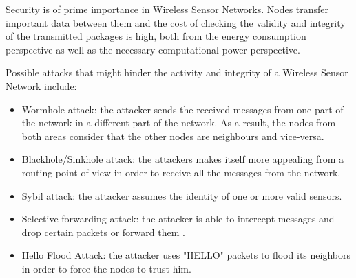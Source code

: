Security is of prime importance in Wireless Sensor Networks. Nodes transfer important data between
them and the cost of checking the validity and integrity of the transmitted packages is high, both from 
the energy consumption perspective as well as the necessary computational power perspective.

Possible attacks that might hinder the activity and integrity of a Wireless Sensor Network include:
\begin{itemize}

\item Wormhole attack: the attacker sends the received messages from one part of the network in a different part of the network. As a result, the nodes from both areas consider that the other nodes are neighbours and vice-versa.
\item Blackhole/Sinkhole attack: the attackers makes itself more appealing from a routing point of view in order to receive all the messages from the network.
\item Sybil attack: the attacker assumes the identity of one or more valid sensors\cite{newsome2004sybil}.
\item Selective forwarding attack: the attacker is able to intercept messages and drop certain packets or forward them \cite{kaplantzis2007detecting}.
\item Hello Flood Attack: the attacker uses "HELLO" packets to flood its neighbors in order to force the nodes to trust him.

\end{itemize}

